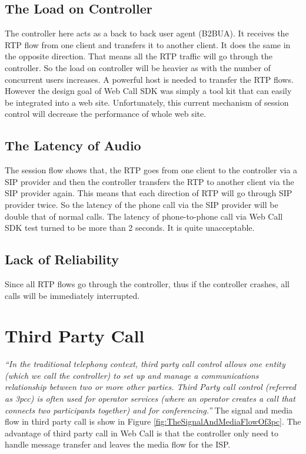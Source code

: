 \subsection{The Load on Controller}
\label{sec:Solution:ProblemOfRelayCall:TheLoadOnController}
 
The controller here acts as a back to back user agent (B2BUA). It receives the RTP flow from one client and transfers it to another client. It does the same in the opposite direction. That means all the RTP traffic will go through the controller. So the load on controller will be heavier as with the number of concurrent users increases. A powerful host is needed to transfer the RTP flows. However the design goal of Web Call SDK was simply a tool kit that can easily be integrated into a web site. Unfortunately, this  current mechanism of session control will decrease the performance of whole web site. 

\subsection{The Latency of Audio}
\label{sec:Solution:ProblemOfRelayCall:TheLatencyOfThePhoneCall}
 
The session flow shows that, the RTP goes from one client to the controller via a SIP provider and then the controller transfers the RTP to another client via the SIP provider again. This means that each direction of RTP will go through SIP provider twice. So the latency of the phone call via the SIP provider will be double that of normal calls.  The latency of phone-to-phone call via Web Call SDK test turned to be more than 2 seconds. It is quite unacceptable. 

\subsection{Lack of Reliability}
\label{sec:Solution:ProblemOfRelayCall:LackOfReliability}

Since all RTP flows go through the controller, thus if the controller crashes, all calls will be immediately interrupted. 

\section{Third Party Call}
\label{sec:Solution:ThirdPartyCall}

\textit{``In the traditional telephony context, third party call control allows one entity (which we call the controller) to set up and manage a communications relationship between two or more other parties. Third Party call control (referred as 3pcc) is often used for operator services (where an operator creates a call that connects two participants together) and for conferencing.''} \cite{RFC3725} The signal and media flow in third party call is show in Figure \ref{fig:TheSignalAndMediaFlowOf3pc}. The advantage of third party call in Web Call is that the controller only need to handle message transfer and leaves the media flow for the ISP.

